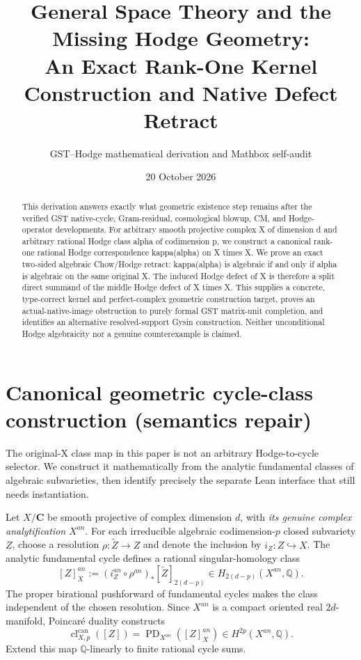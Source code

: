 \documentclass[11pt,a4paper]{article}
\title{General Space Theory and the Missing Hodge Geometry:\\
An Exact Rank-One Kernel Construction and Native Defect Retract}
\author{GST--Hodge mathematical derivation and Mathbox self-audit}
\date{20 October 2026}
\newcommand{\Q}{\mathbb Q}
\begin{document}
\maketitle
\begin{abstract}
This derivation answers exactly what geometric existence step remains
after the verified GST native-cycle, Gram-residual, cosmological
blowup, CM, and Hodge-operator developments.  For arbitrary
smooth projective complex X of dimension d and arbitrary rational
Hodge class alpha of codimension p, we construct a canonical rank-one
rational Hodge correspondence kappa(alpha) on X times X.
We prove an exact two-sided algebraic Chow/Hodge retract:
kappa(alpha) is algebraic if and only if alpha is algebraic on the
same original X.  The induced Hodge defect of X is therefore a
split direct summand of the middle Hodge defect of X times X.
This supplies a concrete, type-correct kernel and perfect-complex
geometric construction target, proves an actual-native-image
obstruction to purely formal GST matrix-unit completion, and
identifies an alternative resolved-support Gysin construction.
Neither unconditional Hodge algebraicity nor a genuine
counterexample is claimed.
\end{abstract}

\section{Canonical geometric cycle-class construction (semantics repair)}

The original-X class map in this paper is not an arbitrary
Hodge-to-cycle selector. We construct it mathematically from the
analytic fundamental classes of algebraic subvarieties, then identify
precisely the separate Lean interface that still needs instantiation.

Let \(X/\mathbf C\) be smooth projective of complex dimension \(d\),
with \emph{its genuine complex analytification} \(X^{an}\). For each
irreducible algebraic codimension-\(p\) closed subvariety \(Z\), choose
a resolution \(\rho:\widetilde Z\to Z\) and denote the inclusion by
\(i_Z:Z\hookrightarrow X\). The analytic fundamental cycle defines
a rational singular-homology class
\[
 [Z]_{X}^{an}:=(i_Z^{an}\circ\rho^{an})_*[\widetilde Z]_
 {2(d-p)}
 \in H_{2(d-p)}(X^{an},\Q).
\]
The proper birational pushforward of fundamental cycles makes the
class independent of the chosen resolution. Since \(X^{an}\) is a
compact oriented real \(2d\)-manifold, Poincar\'e duality constructs
\[
 \boxed{\operatorname{cl}^{\mathrm{can}}_{X,p}([Z])
   =\operatorname{PD}_{X^{an}}([Z]_{X}^{an})
   \in H^{2p}(X^{an},\Q).}                     \tag{C1}
\]
Extend this map \(\Q\)-linearly to finite rational cycle sums.
\end{document}
